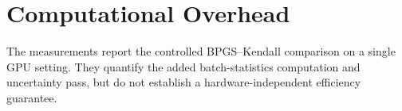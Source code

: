 \section{Computational Overhead}
\label{app:overhead}


The measurements report the controlled BPGS--Kendall comparison on a single GPU setting. They
quantify the added batch-statistics computation and uncertainty pass, but do not establish a
hardware-independent efficiency guarantee.
